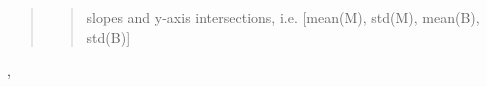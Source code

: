 \documentclass[a4paper,10pt,english]{sphinxmanual}
\begin{document}
\begin{fulllineitems}
\begin{quote}
\begin{description}
\begin{quote}
slopes and y-axis intersections, i.e. {[}mean(M), std(M), mean(B),
std(B){]}
\end{quote}

\end{description}\end{quote}




{\hyperref[functions:astrolyze.functions.astro_functions.grey_body_fit]{}}, {\hyperref[functions:astrolyze.functions.astro_functions.generate_monte_carlo_data_line]{}}



\end{fulllineitems}

\end{document}
